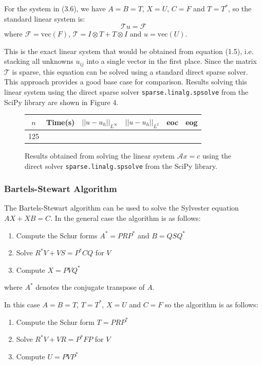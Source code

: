 \documentclass{article}
\numberwithin{equation}{section}
\begin{document}
For the system in (3.6), we have $A=B=T$, $X=U$, $C=F$ and $T=T^*$, so the standard linear system is:
\begin{equation}
\mathcal{T}u = \mathcal{F}
\end{equation}
where $\mathcal{F} = \text{vec}(F)$, $\mathcal{T} = I \otimes T + T \otimes I$ and $u = \text{vec}(U)$. 

This is the exact linear system that would be obtained from equation (1.5), i.e. stacking all unknowns $u_{ij}$ into a single vector in the first place. Since the matrix $\mathcal{T}$ is sparse, this equation can be solved using a standard direct sparse solver. This approach provides a good base case for comparison. Results solving this linear system using the direct sparse solver \texttt{sparse.linalg.spsolve} from the SciPy library are shown in Figure 4.

\begin{figure}[H]
\centering
\begin{tabular}{|c|c|c|c|c|c|}
\hline
$n$ & Time(s) & $|| u - u_h ||_{L^{\infty}}$ &$|| u - u_h ||_{L^{2}}$ & eoc & eog \\
\hline
125 & & & & & \\
\hline
\end{tabular}
\captionsetup{justification=centering}
\caption{Results obtained from solving the linear system $\mathcal{A} x = c$ using the direct solver  \texttt{sparse.linalg.spsolve} from the SciPy library.}
\end{figure}

\subsubsection{Bartels-Stewart Algorithm}
The Bartels-Stewart algorithm \cite{Bartels} can be used to solve the Sylvester equation $AX + XB = C$. In the general case the algorithm is as follows:
\begin{enumerate}
\item Compute the Schur forms $A^* = PRP^*$ and $B=QSQ^*$
\item Solve $R^*V + VS = P^*CQ$ for $V$
\item Compute $X=PVQ^*$
\end{enumerate}
where $A^*$ denotes the conjugate transpose of $A$.

In this case $A=B=T$, $T=T^*$, $X=U$ and $C=F$ so the algorithm is as follows:
\begin{enumerate}
\item Compute the Schur form $T=PRP^*$
\item Solve $R^*V + VR = P^*FP$ for $V$
\item Compute $U=PVP^*$
\end{enumerate}
\end{document}
